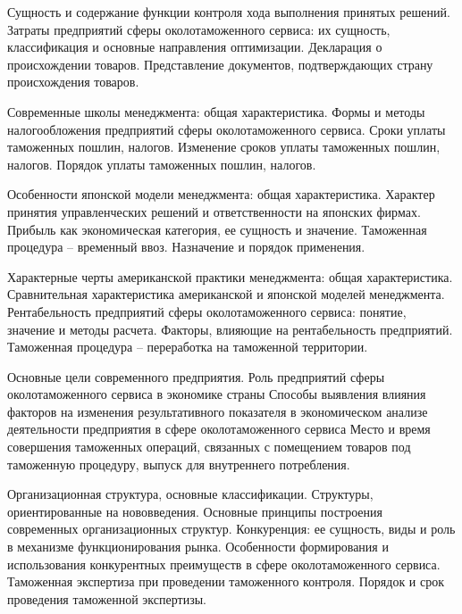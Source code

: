 \documentclass[
	11pt,
	a4paper,
	]
	{article}
\begin{document}
\noindent{} 
	{
		Сущность и содержание функции контроля хода выполнения принятых решений.
	}{
		Затраты предприятий сферы околотаможенного сервиса: их сущность, классификация и основные направления оптимизации.
	}{
		Декларация о происхождении товаров. Представление документов, подтверждающих страну происхождения товаров.
	}

\bigskip

\noindent{} 
	{
		Современные школы менеджмента: общая характеристика.
	}{
		Формы и методы налогообложения предприятий сферы околотаможенного сервиса.
	}{
		Сроки уплаты таможенных пошлин, налогов. Изменение сроков уплаты таможенных пошлин, налогов. Порядок уплаты таможенных пошлин, налогов.
	}

\bigskip

\noindent{} 
	{
		Особенности японской модели менеджмента: общая характеристика. Характер принятия управленческих решений и ответственности на японских фирмах.
	}{
		Прибыль как экономическая категория, ее сущность и значение.
	}{
		Таможенная процедура – временный ввоз. Назначение и порядок применения.
	}

\bigskip

\noindent{} 
	{
		Характерные черты американской практики менеджмента: общая характеристика. Сравнительная характеристика американской и японской моделей менеджмента.
	}{
		Рентабельность предприятий сферы околотаможенного сервиса: понятие, значение и методы расчета. Факторы, влияющие на рентабельность предприятий.
	}{
		Таможенная процедура – переработка на таможенной территории.
	}

\bigskip

\noindent{} 
	{
		Основные цели современного предприятия. Роль предприятий сферы околотаможенного сервиса в экономике страны
	}{
		Способы выявления влияния факторов на изменения результативного показателя в экономическом анализе деятельности предприятия в сфере околотаможенного сервиса
	}{
		Место и время совершения таможенных операций, связанных с помещением товаров под таможенную процедуру, выпуск для внутреннего потребления.
	}

\bigskip

\noindent{} 
	{
		Организационная структура, основные классификации. Структуры, ориентированные на нововведения. Основные принципы построения современных организационных структур.
	}{
		Конкуренция: ее сущность, виды и роль в механизме функционирования рынка. Особенности формирования и использования конкурентных преимуществ в сфере околотаможенного сервиса.
	}{
		Таможенная экспертиза при проведении таможенного контроля. Порядок и срок проведения таможенной экспертизы.
	}
\end{document}
